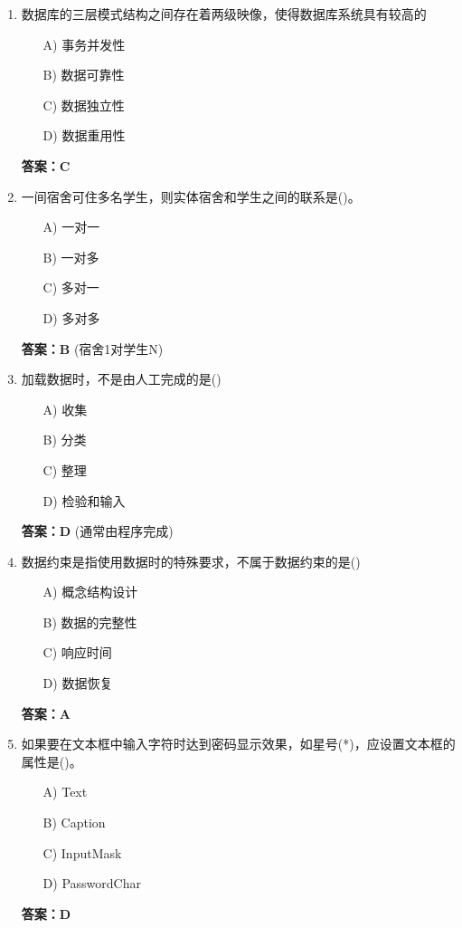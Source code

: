 \documentclass[a4paper,12pt]{article}
\begin{document}
\begin{enumerate}[label=\arabic*.]
\item 数据库的三层模式结构之间存在着两级映像，使得数据库系统具有较高的
\begin{itemize}
    \item[A)] 事务并发性
    \item[B)] 数据可靠性
    \item[C)] 数据独立性
    \item[D)] 数据重用性
\end{itemize}
\textbf{答案：C}

\item 一间宿舍可住多名学生，则实体宿舍和学生之间的联系是()。
\begin{itemize}
    \item[A)] 一对一
    \item[B)] 一对多
    \item[C)] 多对一
    \item[D)] 多对多
\end{itemize}
\textbf{答案：B} (宿舍1对学生N)

\item 加载数据时，不是由人工完成的是()
\begin{itemize}
    \item[A)] 收集
    \item[B)] 分类
    \item[C)] 整理
    \item[D)] 检验和输入
\end{itemize}
\textbf{答案：D} (通常由程序完成)

\item 数据约束是指使用数据时的特殊要求，不属于数据约束的是()
\begin{itemize}
    \item[A)] 概念结构设计
    \item[B)] 数据的完整性
    \item[C)] 响应时间
    \item[D)] 数据恢复
\end{itemize}
\textbf{答案：A}

\item 如果要在文本框中输入字符时达到密码显示效果，如星号(*)，应设置文本框的属性是()。
\begin{itemize}
    \item[A)] Text
    \item[B)] Caption
    \item[C)] InputMask
    \item[D)] PasswordChar
\end{itemize}
\textbf{答案：D}


\end{enumerate}
\end{document}
